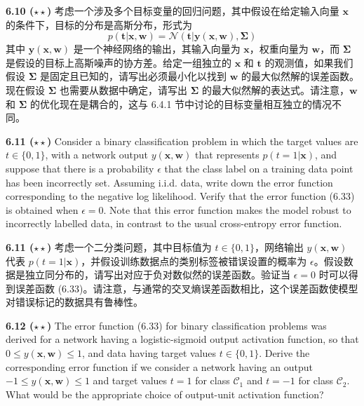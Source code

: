 \documentclass{article}
\begin{document}
\textbf{6.10 ($\star\star$)} 考虑一个涉及多个目标变量的回归问题，其中假设在给定输入向量 $\mathbf{x}$ 的条件下，目标的分布是高斯分布，形式为
\begin{equation}
p(\mathbf{t}|\mathbf{x}, \mathbf{w}) = \mathcal{N}(\mathbf{t}|\mathbf{y}(\mathbf{x}, \mathbf{w}), \boldsymbol{\Sigma})
\tag{6.66}
\end{equation}
其中 $\mathbf{y}(\mathbf{x}, \mathbf{w})$ 是一个神经网络的输出，其输入向量为 $\mathbf{x}$，权重向量为 $\mathbf{w}$，而 $\boldsymbol{\Sigma}$ 是假设的目标上高斯噪声的协方差。给定一组独立的 $\mathbf{x}$ 和 $\mathbf{t}$ 的观测值，如果我们假设 $\boldsymbol{\Sigma}$ 是固定且已知的，请写出必须最小化以找到 $\mathbf{w}$ 的最大似然解的误差函数。现在假设 $\boldsymbol{\Sigma}$ 也需要从数据中确定，请写出 $\boldsymbol{\Sigma}$ 的最大似然解的表达式。请注意，$\mathbf{w}$ 和 $\boldsymbol{\Sigma}$ 的优化现在是耦合的，这与 6.4.1 节中讨论的目标变量相互独立的情况不同。

\vspace{1em}

\textbf{6.11 ($\star\star$)} Consider a binary classification problem in which the target values are $t \in \{0, 1\}$, with a network output $y(\mathbf{x}, \mathbf{w})$ that represents $p(t=1|\mathbf{x})$, and suppose that there is a probability $\epsilon$ that the class label on a training data point has been incorrectly set. Assuming i.i.d. data, write down the error function corresponding to the negative log likelihood. Verify that the error function (6.33) is obtained when $\epsilon = 0$. Note that this error function makes the model robust to incorrectly labelled data, in contrast to the usual cross-entropy error function.

\textbf{6.11 ($\star\star$)} 考虑一个二分类问题，其中目标值为 $t \in \{0, 1\}$，网络输出 $y(\mathbf{x}, \mathbf{w})$ 代表 $p(t=1|\mathbf{x})$，并假设训练数据点的类别标签被错误设置的概率为 $\epsilon$。假设数据是独立同分布的，请写出对应于负对数似然的误差函数。验证当 $\epsilon = 0$ 时可以得到误差函数 (6.33)。请注意，与通常的交叉熵误差函数相比，这个误差函数使模型对错误标记的数据具有鲁棒性。

\vspace{1em}

\textbf{6.12 ($\star\star$)} The error function (6.33) for binary classification problems was derived for a network having a logistic-sigmoid output activation function, so that $0 \le y(\mathbf{x}, \mathbf{w}) \le 1$, and data having target values $t \in \{0, 1\}$. Derive the corresponding error function if we consider a network having an output $-1 \le y(\mathbf{x}, \mathbf{w}) \le 1$ and target values $t=1$ for class $\mathcal{C}_1$ and $t=-1$ for class $\mathcal{C}_2$. What would be the appropriate choice of output-unit activation function?
\end{document}
